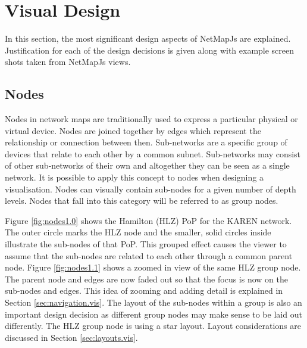 \documentclass[11pt, a4paper]{report}
\begin{document}
\chapter{Visual Design} 
\label{sec:visual-design}

In this section, the most significant design aspects of NetMapJs are explained.
Justification for each of the design decisions is given along with example
screen shots taken from NetMapJs views.

\section{Nodes}
\label{sec:nodes.vis}


Nodes in network maps are traditionally used to express a particular physical or
virtual device. Nodes are joined together by edges which represent the
relationship or connection between then. Sub-networks are a specific group of
devices that relate to each other by a common subnet. Sub-networks may consist of
other sub-networks of their own and altogether they can be seen as a single
network. It is possible to apply this concept to nodes when designing a
visualisation. Nodes can visually contain sub-nodes for a given number
of depth levels. Nodes that fall into this category will be referred to as
group nodes.

Figure \ref{fig:nodes1.0} shows the Hamilton (HLZ) PoP for the KAREN network.
The outer circle marks the HLZ node and the smaller, solid circles inside
illustrate the sub-nodes of that PoP. This grouped effect causes the viewer to
assume that the sub-nodes are related to each other through a common parent
node. Figure \ref{fig:nodes1.1} shows a zoomed in view of the same HLZ group
node. The parent node and edges are now faded out so that the focus is now on
the sub-nodes and edges. This idea of zooming and adding detail is explained in
Section \ref{sec:navigation.vis}. The layout of the sub-nodes within a group is
also an important design decision as different group nodes may make sense to be
laid out differently. The HLZ group node is using a star layout. Layout
considerations are discussed in Section \ref{sec:layouts.vis}.
\end{document}
